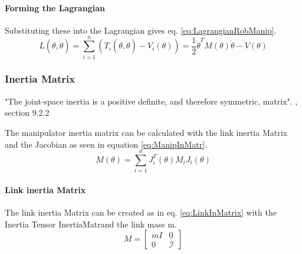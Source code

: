 \paragraph{Forming the Lagrangian}
Substituting these into the Lagrangian gives eq. \ref{eq:LagrangianRobManip}.
\begin{equation}\label{eq:LagrangianRobManip}
	L(\theta, \dot{\theta})= \sum_{i=1}^{n} (T_i(\theta,\dot{\theta})- V_i(\theta)) = \frac{1}{2} \dot{\theta}^T M(\theta)\dot{\theta}-V(\theta)
\end{equation}



%

%
%



\subsubsection{Inertia Matrix }

"The joint-space inertia is a positive definite, and therefore symmetric, matrix". \cite{CorkeRoboticVisionControl}, section 9.2.2

The manipulator inertia matrix can be calculated with the link inertia Matrix and the Jacobian as seen in equation \ref{eq:ManipInMatr}.
\begin{equation}\label{eq:ManipInMatr}
	M(\theta) = \sum_{i=1}^{n} J_i^T(\theta) M_i J_i(\theta)
\end{equation}

\paragraph{Link inertia Matrix}
The link inertia Matrix can be created as in eq. \ref{eq:LinkInMatrix} with the Inertia Tensor \gls{InertiaMatr}and the link mass \gls{m}.
\begin{equation}\label{eq:LinkInMatrix}
	M= 
	\begin{bmatrix}
	mI & 0\\
	0  & \mathcal{I}
	\end{bmatrix}
\end{equation}

